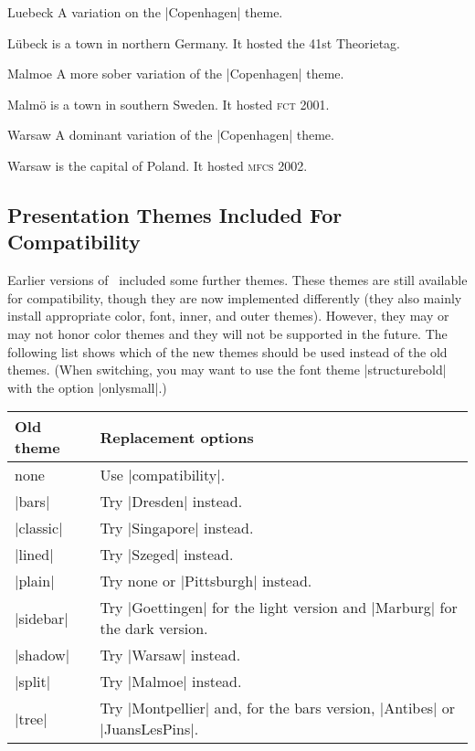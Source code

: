 \begin{themeexample}{Luebeck}
  A variation on the |Copenhagen| theme.

  L\"ubeck is a town in northern Germany. It hosted the 41st Theorietag.
\end{themeexample}

\begin{themeexample}{Malmoe}
  A more sober variation of the |Copenhagen| theme.

  Malm\"o is a town in southern Sweden. It hosted \textsc{fct} 2001.
\end{themeexample}

\begin{themeexample}{Warsaw}
  A dominant variation of the |Copenhagen| theme.

  Warsaw is the capital of Poland. It hosted \textsc{mfcs} 2002.
\end{themeexample}


\subsection{Presentation Themes Included For Compatibility}

Earlier versions of \beamer\ included some further themes. These themes are still available for compatibility, though they are now implemented differently (they also mainly install appropriate color, font, inner, and outer themes). However, they may or may not honor color themes and they will not be supported in the future. The following list shows which of the new themes should be used instead of the old themes. (When switching, you may want to use the font theme |structurebold| with the option |onlysmall|.)

\medskip
\begin{tabular}{lp{13cm}}
  Old theme & Replacement options \\\hline
  none & Use |compatibility|. \\
  |bars| & Try |Dresden| instead. \\
  |classic| & Try |Singapore| instead. \\
  |lined| & Try |Szeged| instead. \\
  |plain| & Try none or |Pittsburgh| instead. \\
  |sidebar| & Try |Goettingen| for the light version and |Marburg| for
  the dark version. \\
  |shadow| & Try |Warsaw| instead. \\
  |split| & Try |Malmoe| instead. \\
  |tree| & Try |Montpellier| and, for the bars version, |Antibes| or
  |JuansLesPins|.
\end{tabular}
